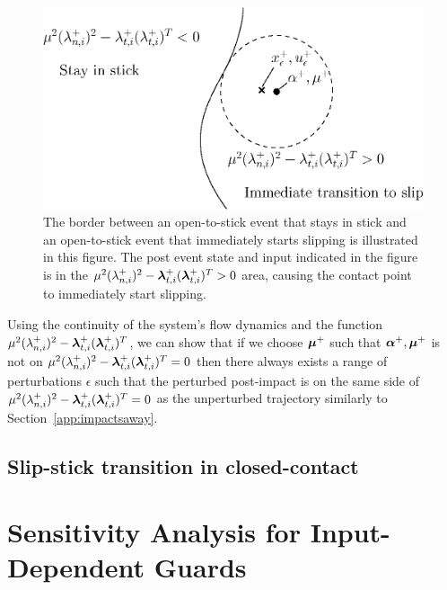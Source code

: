 \documentclass[../DC2017114Bouma.tex]{subfiles}
\begin{document}
\begin{figure}[h]
\centering
\includegraphics[width=.55\textwidth]{stickimmedslip.eps}\caption{The border between an open-to-stick event that stays in stick and an open-to-stick event that immediately starts slipping is illustrated in this figure. The post event state and input indicated in the figure is in the $\mu^2(\lambda^+_{n,i})^2 - \boldsymbol{\lambda}^+_{t,i}(\boldsymbol{\lambda}^+_{t,i})^T > 0$ area, causing the contact point to immediately start slipping.} \label{fig:stickimmedslip}
\end{figure}

Using the continuity of the system's flow dynamics and the function $\mu^2(\lambda^+_{n,i})^2 - \boldsymbol{\lambda}^+_{t,i}(\boldsymbol{\lambda}^+_{t,i})^T$, we can show that if we choose $\boldsymbol{\mu}^+$ such that $\boldsymbol{\alpha}^+,\boldsymbol{\mu}^+$ is not on $\mu^2(\lambda^+_{n,i})^2 - \boldsymbol{\lambda}^+_{t,i}(\boldsymbol{\lambda}^+_{t,i})^T = 0$ then there always exists a range of perturbations $\epsilon$ such that the perturbed post-impact is on the same side of $\mu^2(\lambda^+_{n,i})^2 - \boldsymbol{\lambda}^+_{t,i}(\boldsymbol{\lambda}^+_{t,i})^T = 0$ as the unperturbed trajectory similarly to Section~\ref{app:impactsaway}.

\section{Slip-stick transition in closed-contact}


\pagestyle{fancyreport}
\cleartooddpage
\pagestyle{fancyreport}
\chapter{Sensitivity Analysis for Input-Dependent Guards}\label{app:Csensitivity}
\end{document}
